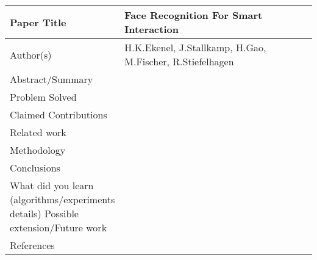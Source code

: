 \documentclass[a4paper,12pt]{article}
\begin{document}
\begin{table}[h]
\begin{tabularx}{1.0\linewidth}{|l|X|}

\hline

Paper Title        & Face Recognition For Smart Interaction \\

\hline

Author(s)           & H.K.Ekenel, J.Stallkamp, H.Gao, M.Fischer, R.Stiefelhagen \\

\hline

Abstract/Summary  & \\

\hline

Problem Solved & \\
\hline
Claimed Contributions & \\
\hline
Related work & \\
\hline
Methodology & \\
\hline
Conclusions & \\
\hline
\pbox{15cm}{What did you learn \\(algorithms/experiments\\ details) Possible \\ extension/Future work\\}    & \\
\hline
References & \\
\hline

\end{tabularx}
\end{table}
\end{document}
